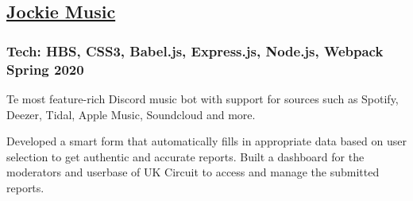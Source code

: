 \subsection*{
	\href{https://bumbleboss.xyz/w/jockiemusic}{Jockie Music}
}
\subsubsection*{
	Tech: HBS, CSS3, Babel.js, Express.js, Node.js, Webpack
	\hspace*{\fill}
	Spring 2020
}
Te most feature-rich Discord music bot with support for sources such as Spotify,
Deezer, Tidal, Apple Music, Soundcloud and more.
\begin{tasks}
	\task Developed a smart form that automatically fills in appropriate data based on
	user selection to get authentic and accurate reports.
	\task Built a dashboard for the moderators and userbase of UK Circuit to access and manage
	the submitted reports.
\end{tasks}
